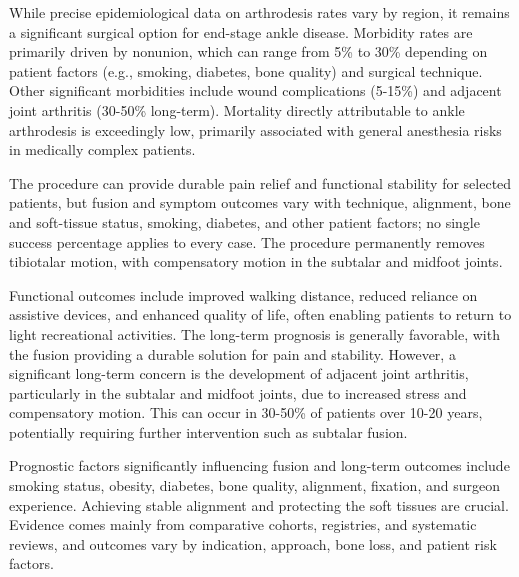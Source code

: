 While precise epidemiological data on arthrodesis rates vary by region, it remains a significant surgical option for end-stage ankle disease. Morbidity rates are primarily driven by nonunion, which can range from 5\% to 30\% depending on patient factors (e.g., smoking, diabetes, bone quality) and surgical technique. Other significant morbidities include wound complications (5-15\%) and adjacent joint arthritis (30-50\% long-term). Mortality directly attributable to ankle arthrodesis is exceedingly low, primarily associated with general anesthesia risks in medically complex patients.

The procedure can provide durable pain relief and functional stability for selected patients, but fusion and symptom outcomes vary with technique, alignment, bone and soft-tissue status, smoking, diabetes, and other patient factors; no single success percentage applies to every case. The procedure permanently removes tibiotalar motion, with compensatory motion in the subtalar and midfoot joints.

Functional outcomes include improved walking distance, reduced reliance on assistive devices, and enhanced quality of life, often enabling patients to return to light recreational activities. The long-term prognosis is generally favorable, with the fusion providing a durable solution for pain and stability. However, a significant long-term concern is the development of adjacent joint arthritis, particularly in the subtalar and midfoot joints, due to increased stress and compensatory motion. This can occur in 30-50\% of patients over 10-20 years, potentially requiring further intervention such as subtalar fusion. 

Prognostic factors significantly influencing fusion and long-term outcomes include smoking status, obesity, diabetes, bone quality, alignment, fixation, and surgeon experience. Achieving stable alignment and protecting the soft tissues are crucial. Evidence comes mainly from comparative cohorts, registries, and systematic reviews, and outcomes vary by indication, approach, bone loss, and patient risk factors.

